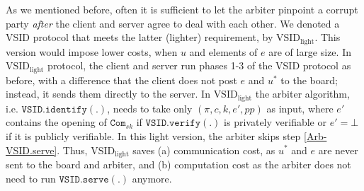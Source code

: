 


\begin{remark}\label{remark::light-VSID}
As we mentioned before, often it is sufficient  to let the arbiter pinpoint a corrupt party \emph{after} the client and server agree to deal with each other. We denoted a VSID protocol that meets the latter (lighter) requirement, by $\text{VSID}_{\scriptscriptstyle \text{light}}$. This  version would impose lower costs, when $u$ and elements of $e$ are of large size. In  $\text{VSID}_{\scriptscriptstyle \text{light}}$ protocol, the client and server  run phases 1-3 of the VSID protocol as before, with a difference that the client does not post $e$ and $u^{\scriptscriptstyle*}$ to the board; instead, it sends them directly to the server. In $\text{VSID}_{\scriptscriptstyle\text{light}}$  the arbiter algorithm, i.e. $\mathtt{VSID.identify}(.)$, needs to take only $(\pi,c,k,e',{pp})$ as input, where $e'$ contains the opening of $\mathtt{Com}_{\scriptscriptstyle {sk}}$ if $\mathtt{VSID.verify}(.)$ is privately verifiable or $e'=\bot$ if  it is publicly verifiable. In this light version, the arbiter   skips step \ref{Arb-VSID.serve}. Thus, $\text{VSID}_{\scriptscriptstyle\text{light}}$ saves (a)  communication cost, as   $u^{\scriptscriptstyle*}$ and $e$ are never sent to the board and  arbiter, and (b) computation  cost as the arbiter does not need to run $\mathtt{VSID.serve}(.)$ anymore. 
\end{remark}











